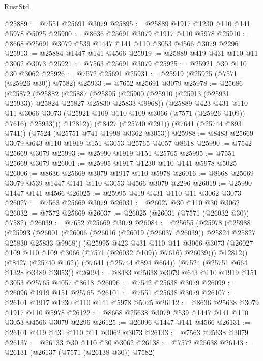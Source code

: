 \begin{lexlean}{RustStd}
\begin{coremodule}
@25889 := @7551 @25691 @3079
@25895 := @25889 @1917 @1230 @110 @141 @5978 @5025
@25900 := @8636 @25691 @3079 @1917 @110 @5978
@25910 := @8668 @25691 @3079 @539 @1447 @141 @110 @3053 @4566 @3079 @2296
@25913 := @25884 @1447 @141 @4566
@25919 := @25889 @419 @431 @110 @11 @3062 @3073
@25921 := @7563 @25691 @3079
@25925 := @25921 @30 @110 @30 @3062
@25926 := @7572 @25691
@25931 := @25919 (@25925 (@7571 (@25926 @30)) @7582)
@25933 := @7652 @25691 @3079
@25978 := @25686
    (@25872
      (@25882
        (@25887
          (@25895
            (@25900 (@25910 (@25913 (@25931 @25933)) @25824 @25827 @25830 @25833 @9968))
            (@25889
              @423
              @431
              @110
              @11
              @3066
              @3073
              (@25921 @109 @110 @109 @3066 (@7571 (@25926 @109)) @7616)
              @25933)))
        @12812))
    (@8427 (@25740 @291))
    (@7641 (@25744 @893 @741))
    (@7524 (@25751 @741 @1998 @3362 @3053))
@25988 := @8483 @25669 @3079 @643 @110 @1919 @151 @3053 @25765 @4057 @8618
@25990 := @7542 @25669 @3079
@25993 := @25990 @1919 @151 @25765
@25995 := @7551 @25669 @3079
@26001 := @25995 @1917 @1230 @110 @141 @5978 @5025
@26006 := @8636 @25669 @3079 @1917 @110 @5978
@26016 := @8668 @25669 @3079 @539 @1447 @141 @110 @3053 @4566 @3079 @2296
@26019 := @25990 @1447 @141 @4566
@26025 := @25995 @419 @431 @110 @11 @3062 @3073
@26027 := @7563 @25669 @3079
@26031 := @26027 @30 @110 @30 @3062
@26032 := @7572 @25669
@26037 := @26025 (@26031 (@7571 (@26032 @30)) @7582)
@26039 := @7652 @25669 @3079
@26084 := @25655
    (@25978
      (@25988
        (@25993
          (@26001
            (@26006 (@26016 (@26019 (@26037 @26039)) @25824 @25827 @25830 @25833 @9968))
            (@25995
              @423
              @431
              @110
              @11
              @3066
              @3073
              (@26027 @109 @110 @109 @3066 (@7571 (@26032 @109)) @7616)
              @26039)))
        @12812))
    (@8427 (@25740 @162))
    (@7641 (@25744 @894 @664))
    (@7524 (@25751 @664 @1328 @3489 @3053))
@26094 := @8483 @25638 @3079 @643 @110 @1919 @151 @3053 @25765 @4057 @8618
@26096 := @7542 @25638 @3079
@26099 := @26096 @1919 @151 @25765
@26101 := @7551 @25638 @3079
@26107 := @26101 @1917 @1230 @110 @141 @5978 @5025
@26112 := @8636 @25638 @3079 @1917 @110 @5978
@26122 := @8668 @25638 @3079 @539 @1447 @141 @110 @3053 @4566 @3079 @2296
@26125 := @26096 @1447 @141 @4566
@26131 := @26101 @419 @431 @110 @11 @3062 @3073
@26133 := @7563 @25638 @3079
@26137 := @26133 @30 @110 @30 @3062
@26138 := @7572 @25638
@26143 := @26131 (@26137 (@7571 (@26138 @30)) @7582)

\end{coremodule}
\end{lexlean}
